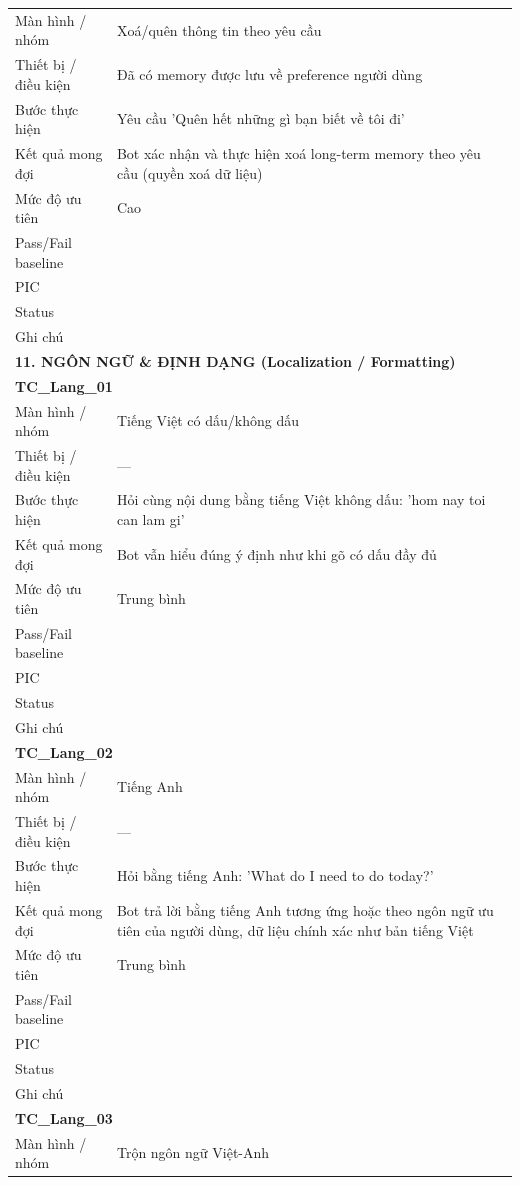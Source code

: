 \documentclass[12pt,a4paper]{article}
\begin{document}
\begin{longtable}{p{3.0cm}p{11.5cm}}
Màn hình / nhóm & Xoá/quên thông tin theo yêu cầu \\
Thiết bị / điều kiện & Đã có memory được lưu về preference người dùng \\
Bước thực hiện & Yêu cầu 'Quên hết những gì bạn biết về tôi đi' \\
Kết quả mong đợi & Bot xác nhận và thực hiện xoá long-term memory theo yêu cầu (quyền xoá dữ liệu) \\
Mức độ ưu tiên & Cao \\
Pass/Fail baseline &  \\
PIC &  \\
Status &  \\
Ghi chú &  \\
\midrule
\multicolumn{2}{l}{\textbf{11. NGÔN NGỮ \& ĐỊNH DẠNG (Localization / Formatting)}} \\ \midrule
\multicolumn{2}{l}{\textbf{TC\_Lang\_01}} \\
Màn hình / nhóm & Tiếng Việt có dấu/không dấu \\
Thiết bị / điều kiện & — \\
Bước thực hiện & Hỏi cùng nội dung bằng tiếng Việt không dấu: 'hom nay toi can lam gi' \\
Kết quả mong đợi & Bot vẫn hiểu đúng ý định như khi gõ có dấu đầy đủ \\
Mức độ ưu tiên & Trung bình \\
Pass/Fail baseline &  \\
PIC &  \\
Status &  \\
Ghi chú &  \\
\midrule
\multicolumn{2}{l}{\textbf{TC\_Lang\_02}} \\
Màn hình / nhóm & Tiếng Anh \\
Thiết bị / điều kiện & — \\
Bước thực hiện & Hỏi bằng tiếng Anh: 'What do I need to do today?' \\
Kết quả mong đợi & Bot trả lời bằng tiếng Anh tương ứng hoặc theo ngôn ngữ ưu tiên của người dùng, dữ liệu chính xác như bản tiếng Việt \\
Mức độ ưu tiên & Trung bình \\
Pass/Fail baseline &  \\
PIC &  \\
Status &  \\
Ghi chú &  \\
\midrule
\multicolumn{2}{l}{\textbf{TC\_Lang\_03}} \\
Màn hình / nhóm & Trộn ngôn ngữ Việt-Anh \\

\end{longtable}
\end{document}
